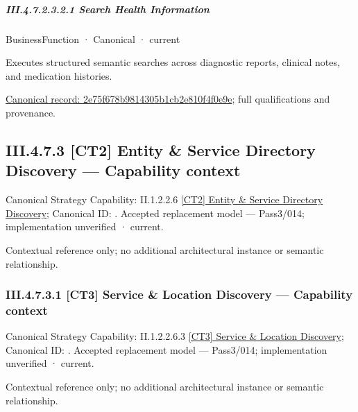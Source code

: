\subparagraph*{III.4.7.2.3.2.1 Search Health Information}
\label{navigation:III.4.7.2.3.2.1}

\label{element:2e75f678b9814305b1cb2e810f4f0e9e}
{\small BusinessFunction · Canonical · current}\par

Executes structured semantic searches across diagnostic reports, clinical notes, and medication histories.


{\footnotesize \href{../../../../continuum/business/business-function/2e75f678b9814305b1cb2e810f4f0e9e.md}{Canonical record: 2e75f678b9814305b1cb2e810f4f0e9e}; full qualifications and provenance.}\par
\subsection*{III.4.7.3 [CT2] Entity \& Service Directory Discovery — Capability context}
\label{navigation:III.4.7.3}

{\small Canonical Strategy Capability: II.1.2.2.6 \hyperref[element:83e30c3e91be432da6d92f30e5d7005d]{[CT2] Entity \& Service Directory Discovery}; Canonical ID: \texttt{}. Accepted replacement model — Pass3/014; implementation unverified · current.}\par
Contextual reference only; no additional architectural instance or semantic relationship.\par
\subsubsection*{III.4.7.3.1 [CT3] Service \& Location Discovery — Capability context}
\label{navigation:III.4.7.3.1}

{\small Canonical Strategy Capability: II.1.2.2.6.3 \hyperref[element:8c313972197c48369767dec1a745d7fc]{[CT3] Service \& Location Discovery}; Canonical ID: \texttt{}. Accepted replacement model — Pass3/014; implementation unverified · current.}\par
Contextual reference only; no additional architectural instance or semantic relationship.\par
